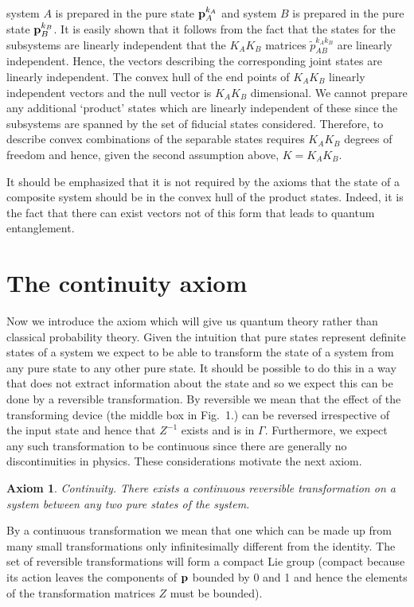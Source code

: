 \documentclass[12pt]{article}
\newtheorem{axiom}{Axiom}
\begin{document}
system $A$ is prepared in the pure state ${\bf p}^{k_A}_A$ and system $B$ is
prepared in the pure state ${\bf p}^{k_B}_B$.  It is easily
shown that it follows
from the fact that the states for the subsystems are linearly
independent that the $K_AK_B$ matrices $\tilde{p}_{AB}^{k_Ak_B}$ are linearly
independent. Hence, the vectors describing the corresponding joint
states are linearly independent.  The convex hull of the end points of
$K_AK_B$ linearly
independent vectors and the null vector is $K_AK_B$ dimensional. We
cannot prepare any additional `product' states which are linearly
independent of these since the subsystems are spanned by the set of
fiducial states considered.
Therefore, to describe convex combinations of the separable states
requires $K_AK_B$ degrees of freedom and hence, given the second
assumption above, $K=K_AK_B$.

It should be emphasized that it is not required by the axioms that the
state of a composite system should be in the convex hull of
the product states. Indeed, it
is the fact that there can exist vectors not of this form that leads to
quantum entanglement.

\section{The continuity axiom}\label{axiomfive}

Now we introduce the axiom which will give us quantum theory rather than
classical probability theory.
Given the intuition that pure states represent definite states of a
system we expect to be able to transform the state of a system
from any pure state to any other pure state.  It should be possible to
do this in a way that does not extract information about the state and
so we expect this can be done by a reversible transformation.
By reversible we mean that the effect of the transforming device
(the middle box in Fig.\ 1.) can be reversed irrespective of the input
state and hence that $Z^{-1}$ exists and is in $\Gamma$.
Furthermore, we expect any such transformation to be continuous since
there are generally no discontinuities in physics.
These considerations motivate the next axiom.
\begin{axiom}
{\rm Continuity}.
There exists a continuous reversible transformation on a system between
any two pure states of the system.
\end{axiom}
By a continuous transformation we mean that one which can be made up from many
small transformations only infinitesimally different from the identity.
The set of reversible transformations will form a compact Lie group
(compact because its action leaves the components of ${\bf p}$ bounded by
0 and 1 and hence the elements of the transformation matrices $Z$ must
be bounded).
\end{document}
